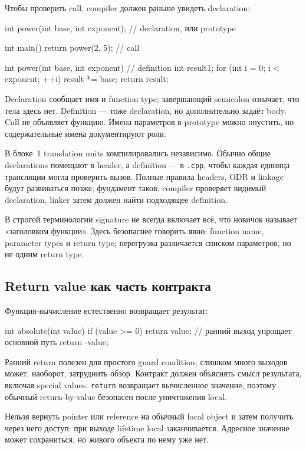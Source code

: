 Чтобы проверить call, compiler должен раньше увидеть declaration:

\begin{cppcode}
int power(int base, int exponent); // declaration, или prototype

int main() {
    return power(2, 5);             // call
}

int power(int base, int exponent) { // definition
    int result{1};
    for (int i = 0; i < exponent; ++i) {
        result *= base;
    }
    return result;
}
\end{cppcode}

Declaration сообщает имя и function type; завершающий semicolon означает,
что тела здесь нет. Definition --- тоже declaration, но дополнительно
задаёт body. Call не объявляет функцию. Имена параметров в prototype можно
опустить, но содержательные имена документируют роли.

В блоке~1 translation units компилировались независимо. Обычно общие
declarations помещают в header, а definition --- в \texttt{.cpp}, чтобы
каждая единица трансляции могла проверить вызов. Полные правила headers, ODR и
linkage будут развиваться позже; фундамент таков: compiler проверяет видимый
declaration, linker затем должен найти подходящее definition.

В строгой терминологии signature не всегда включает всё, что новичок называет
«заголовком функции». Здесь безопаснее говорить явно: function name,
parameter types и return type; перегрузка различается списком параметров, но
не одним return type.

\subsection{Return value как часть контракта}

Функция-вычисление естественно возвращает результат:

\begin{cppcode}
int absolute(int value) {
    if (value >= 0) {
        return value; // ранний выход упрощает основной путь
    }
    return -value;
}
\end{cppcode}

Ранний return полезен для простого guard condition; слишком много выходов
может, наоборот, затруднить обзор. Контракт должен объяснять смысл результата,
включая special values. \texttt{return} возвращает вычисленное значение,
поэтому обычный return-by-value безопасен после уничтожения local.

\begin{ubbox}
Нельзя вернуть pointer или reference на обычный local object и затем получить
через него доступ: при выходе lifetime local заканчивается. Адресное значение
может сохраниться, но живого объекта по нему уже нет.
\end{ubbox}

